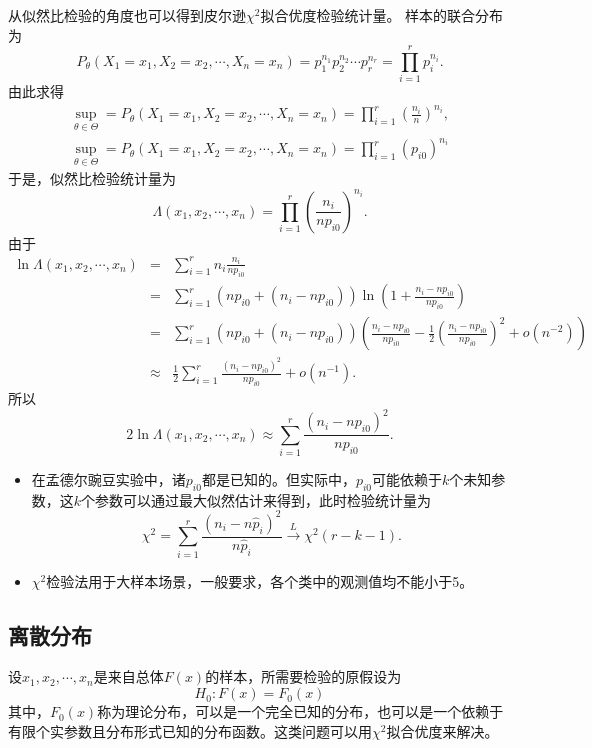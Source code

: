 从似然比检验的角度也可以得到皮尔逊$\chi^2$拟合优度检验统计量。
样本的联合分布为
$$
P_{\theta}(X_1 = x_1,X_2=x_2,\cdots,X_n = x_n) = p_1^{n_1}p_2^{n_2}\cdots p_r^{n_r}=\prod_{i=1}^r p_i^{n_i}.
$$
由此求得
\begin{eqnarray*}
    \sup_{\theta \in\Theta} =P_{\theta}(X_1 = x_1,X_2=x_2,\cdots,X_n = x_n) = \prod_{i=1}^r \left(\frac{n_i}{n}\right)^{n_i},\\
     \sup_{\theta \in\Theta} =P_{\theta}(X_1 = x_1,X_2=x_2,\cdots,X_n = x_n) = \prod_{i=1}^r \left(p_{i0}\right)^{n_i}
\end{eqnarray*}
于是，似然比检验统计量为
$$
\Lambda(x_1,x_2,\cdots,x_n ) = \prod_{i=1}^r \left(\frac{n_i}{np_{i0}}\right)^{n_i}.
$$
由于
\begin{eqnarray*}
    \ln \Lambda(x_1,x_2,\cdots,x_n ) &=&\sum_{i=1}^r n_i \frac{n_i}{np_{i0}}\\
    &=& \sum_{i=1}^r ( np_{i0} + (n_i-np_{i0})) \ln \left( 1 + \frac{n_i - np_{i0}}{np_{i0}}\right)\\
    &=& \sum_{i=1}^r ( np_{i0} + (n_i-np_{i0})) \left( \frac{n_i - np_{i0}}{np_{i0}} - \frac{1}{2} \left(  \frac{n_i - np_{i0}}{np_{i0}}\right)^2 + o(n^{-2})\right)\\
    &\approx& \frac{1}{2} \sum_{i=1}^r \frac{(n_i - np_{i0})^2}{np_{i0}} + o(n^{-1}). 
\end{eqnarray*}
所以
$$
2\ln \Lambda(x_1,x_2,\cdots,x_n )  \approx \sum_{i=1}^r \frac{(n_i - np_{i0})^2}{np_{i0}} .
$$
\begin{remark}
    \begin{itemize}
        \item 在孟德尔豌豆实验中，诸$p_{i0}$都是已知的。但实际中，$p_{i0}$可能依赖于$k$个未知参数，这$k$个参数可以通过最大似然估计来得到，此时检验统计量为
        $$
        \chi^2 = \sum_{i=1}^r \frac{(n_i - n\hat{p}_{i})^2}{n\hat{p}_{i}} \overset{L}{\rightarrow} \chi^2(r-k-1).
        $$
        \item $\chi^2$检验法用于大样本场景，一般要求，各个类中的观测值均不能小于5。
    \end{itemize}
\end{remark}
\subsection{离散分布}
设$x_1,x_2,\cdots,x_n$是来自总体$F(x)$的样本，所需要检验的原假设为
$$
H_0: F(x) = F_0(x)
$$
其中，$F_0(x)$称为理论分布，可以是一个完全已知的分布，也可以是一个依赖于有限个实参数且分布形式已知的分布函数。这类问题可以用$\chi^2$拟合优度来解决。

